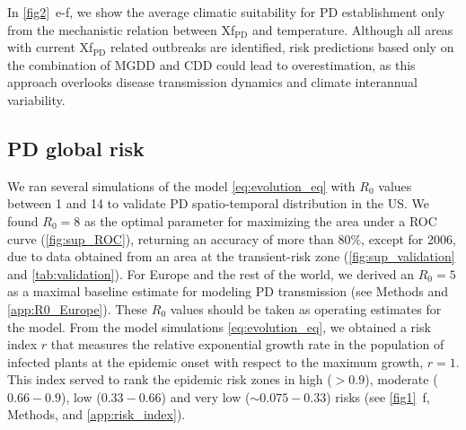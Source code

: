     In \cref{fig2}~\textcolor{ref_color}{e-f}, we show the average climatic
    suitability for PD
    establishment only from the mechanistic relation between Xf$_{\textrm{PD}}$
    and
    temperature. Although all areas with current Xf$_{\textrm{PD}}$ related
    outbreaks are identified, risk predictions based only on the combination of
    MGDD and CDD could lead to overestimation, as this approach overlooks
    disease transmission dynamics and climate interannual variability.

    \subsection{PD global risk}
    We ran several simulations of the model \cref{eq:evolution_eq} with $R_0$
    values between 1 and 14 to validate PD spatio-temporal distribution in the
    US. We found $R_0=8$ as the optimal parameter for maximizing the area under
    a ROC curve (\cref{fig:sup_ROC}), returning an accuracy of more than
$80\%$, except for 2006, due to data obtained from an area at the
    transient-risk zone (\cref{fig:sup_validation} and \cref{tab:validation}).
    For Europe and the rest of the world, we derived an $R_0=5$ as a maximal
    baseline estimate for modeling PD transmission (see Methods and
    \cref{app:R0_Europe}). These $R_0$ values should be taken as operating
    estimates for the model. From the model simulations \cref{eq:evolution_eq},
    we obtained a risk index $r$ that measures the relative exponential growth
    rate in the population of infected plants at the epidemic onset with
    respect to the maximum growth, $r=1$. This index served to rank the
    epidemic risk zones in high ($> 0.9$), moderate ($0.66-0.9$), low
    ($0.33-0.66$) and very low ($\sim 0.075-0.33$) risks (see
    \cref{fig1}~\textcolor{ref_color}{f},
    Methods, and \cref{app:risk_index}).

